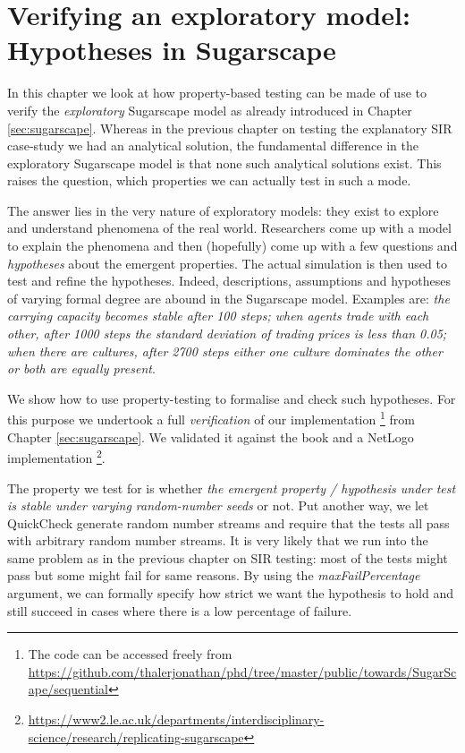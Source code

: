 \chapter{Verifying an exploratory model: \\ Hypotheses in Sugarscape}
\label{ch:prop_exploratory}
In this chapter we look at how property-based testing can be made of use to verify the \textit{exploratory} Sugarscape model \cite{epstein_growing_1996} as already introduced in Chapter \ref{sec:sugarscape}. Whereas in the previous chapter on testing the explanatory SIR case-study we had an analytical solution, the fundamental difference in the exploratory Sugarscape model is that none such analytical solutions exist. This raises the question, which properties we can actually test in such a mode.

The answer lies in the very nature of exploratory models: they exist to explore and understand phenomena of the real world. Researchers come up with a model to explain the phenomena and then (hopefully) come up with a few questions and  \textit{hypotheses} about the emergent properties. The actual simulation is then used to test and refine the hypotheses. Indeed, descriptions, assumptions and hypotheses of varying formal degree are abound in the Sugarscape model. Examples are: \textit{the carrying capacity becomes stable after 100 steps; when agents trade with each other, after 1000 steps the standard deviation of trading prices is less than 0.05; when there are cultures, after 2700 steps either one culture dominates the other or both are equally present}. 

We show how to use property-testing to formalise and check such hypotheses. For this purpose we undertook a full \textit{verification} of our implementation \footnote{The code can be accessed freely from \url{https://github.com/thalerjonathan/phd/tree/master/public/towards/SugarScape/sequential}} from Chapter \ref{sec:sugarscape}. We validated it against the book \cite{epstein_growing_1996} and a NetLogo implementation \cite{weaver_replicating_2009} \footnote{\url{https://www2.le.ac.uk/departments/interdisciplinary-science/research/replicating-sugarscape}}.

The property we test for is whether \textit{the emergent property / hypothesis under test is stable under varying random-number seeds} or not. Put another way, we let QuickCheck generate random number streams and require that the tests all pass with arbitrary random number streams. It is very likely that we run into the same problem as in the previous chapter on SIR testing: most of the tests might pass but some might fail for same reasons. By using the \textit{maxFailPercentage} argument, we can formally specify how strict we want the hypothesis to hold and still succeed in cases where there is a low percentage of failure.

